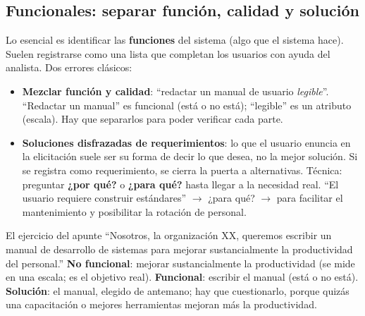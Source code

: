 \documentclass[11pt,a4paper]{article}
\begin{document}
\subsection{Funcionales: separar función, calidad y solución}
Lo esencial es identificar las \textbf{funciones} del sistema (algo que el sistema hace). Suelen registrarse
como una lista que completan los usuarios con ayuda del analista. Dos errores clásicos:
\begin{itemize}
  \item \textbf{Mezclar función y calidad}: ``redactar un manual de usuario \emph{legible}''. ``Redactar un
  manual'' es funcional (está o no está); ``legible'' es un atributo (escala). Hay que separarlos para poder
  verificar cada parte.
  \item \textbf{Soluciones disfrazadas de requerimientos}: lo que el usuario enuncia en la elicitación suele ser
  su forma de decir lo que desea, no la mejor solución. Si se registra como requerimiento, se cierra la puerta a
  alternativas. Técnica: preguntar \textbf{¿por qué?} o \textbf{¿para qué?} hasta llegar a la necesidad real.
  ``El usuario requiere construir estándares'' $\to$ ¿para qué? $\to$ para facilitar el mantenimiento y
  posibilitar la rotación de personal.
\end{itemize}
\begin{ejemplo}{El ejercicio del apunte}
``Nosotros, la organización XX, queremos escribir un manual de desarrollo de sistemas para mejorar
sustancialmente la productividad del personal.'' \textbf{No funcional}: mejorar sustancialmente la
productividad (se mide en una escala; es el objetivo real). \textbf{Funcional}: escribir el manual (está o no
está). \textbf{Solución}: el manual, elegido de antemano; hay que cuestionarlo, porque quizás una capacitación o
mejores herramientas mejoran más la productividad.
\end{ejemplo}
\end{document}
